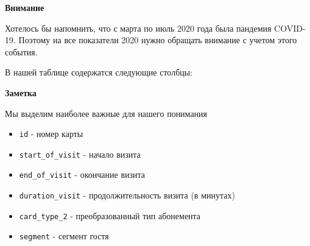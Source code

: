 \documentclass[
  letterpaper,
  DIV=11,
  numbers=noendperiod]{scrartcl}
\begin{document}
\begin{tcolorbox}[enhanced jigsaw, left=2mm, bottomrule=.15mm, opacityback=0, arc=.35mm, colframe=quarto-callout-warning-color-frame, rightrule=.15mm, colback=white, toprule=.15mm, breakable, leftrule=.75mm]
\begin{minipage}[t]{5.5mm}
\textcolor{quarto-callout-warning-color}{\faExclamationTriangle}
\end{minipage}%
\begin{minipage}[t]{\textwidth - 5.5mm}

\textbf{Внимание}\vspace{2mm}

Хотелось бы напомнить, что с марта по июль 2020 года была пандемия
COVID-19. Поэтому на все показатели 2020 нужно обращать внимание с
учетом этого события.

\end{minipage}%
\end{tcolorbox}

В нашей таблице содержатся следующие столбцы:

\begin{tcolorbox}[enhanced jigsaw, left=2mm, bottomrule=.15mm, opacityback=0, arc=.35mm, colframe=quarto-callout-note-color-frame, rightrule=.15mm, colback=white, toprule=.15mm, breakable, leftrule=.75mm]
\begin{minipage}[t]{5.5mm}
\textcolor{quarto-callout-note-color}{\faInfo}
\end{minipage}%
\begin{minipage}[t]{\textwidth - 5.5mm}

\textbf{Заметка}\vspace{2mm}

Мы выделим наиболее важные для нашего понимания

\end{minipage}%
\end{tcolorbox}

\begin{itemize}
\item
  \texttt{id} - номер карты
\item
  \texttt{start\_of\_visit} - начало визита
\item
  \texttt{end\_of\_visit} - окончание визита
\item
  \texttt{duration\_visit} - продолжительность визита (в минутах)
\item
  \texttt{сard\_type\_2} - преобразованный тип абонемента
\item
  \texttt{segment} - сегмент гостя
\end{itemize}
\end{document}
